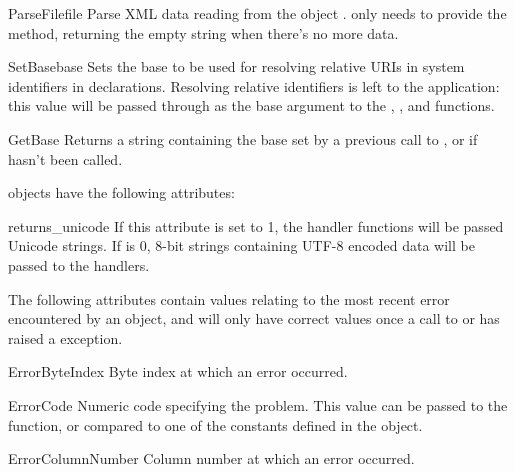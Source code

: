 \begin{methoddesc}[xmlparser]{ParseFile}{file}
Parse XML data reading from the object .   only
needs to provide the  method, returning the
empty string when there's no more data.
\end{methoddesc}

\begin{methoddesc}[xmlparser]{SetBase}{base}
Sets the base to be used for resolving relative URIs in system identifiers in
declarations.  Resolving relative identifiers is left to the application:
this value will be passed through as the base argument to the
, ,
and  functions. 
\end{methoddesc}

\begin{methoddesc}[xmlparser]{GetBase}{}
Returns a string containing the base set by a previous call to
, or  if 
 hasn't been called.
\end{methoddesc}


 objects have the following attributes:

\begin{memberdesc}[xmlparser]{returns_unicode} 
If this attribute is set to 1, the handler functions will be passed
Unicode strings.  If  is 0, 8-bit strings
containing UTF-8 encoded data will be passed to the handlers.
\end{memberdesc}

The following attributes contain values relating to the most recent
error encountered by an  object, and will only have
correct values once a call to  or 
has raised a  exception.

\begin{memberdesc}[xmlparser]{ErrorByteIndex} 
Byte index at which an error occurred.
\end{memberdesc} 

\begin{memberdesc}[xmlparser]{ErrorCode} 
Numeric code specifying the problem.  This value can be passed to the
 function, or compared to one of the constants
defined in the  object.
\end{memberdesc}

\begin{memberdesc}[xmlparser]{ErrorColumnNumber} 
Column number at which an error occurred.
\end{memberdesc}

